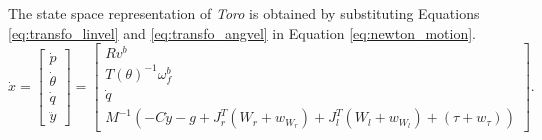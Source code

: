  The state space representation of \emph{Toro} is obtained by substituting Equations \ref{eq:transfo_linvel} and \ref{eq:transfo_angvel} in Equation \ref{eq:newton_motion}. 
\begin{equation}
\label{eq:toro}
	\dot{x} = 
	\begin{bmatrix}
	\dot{p} \\ \dot{\theta} \\ \dot{q} \\ \ddot{y}
	\end{bmatrix}
	=
	\begin{bmatrix}
	R v^b\\	
	T(\theta)^{-1} \omega_f^b \\
	\dot{q}\\
	M^{-1}(-C\dot{y} - g + J_r^{T}(W_{r}+w_{W_r}) +J_l^{T}(W_{l}+w_{W_l}) + (\tau+w_\tau))	
	\end{bmatrix}.
\end{equation}	

